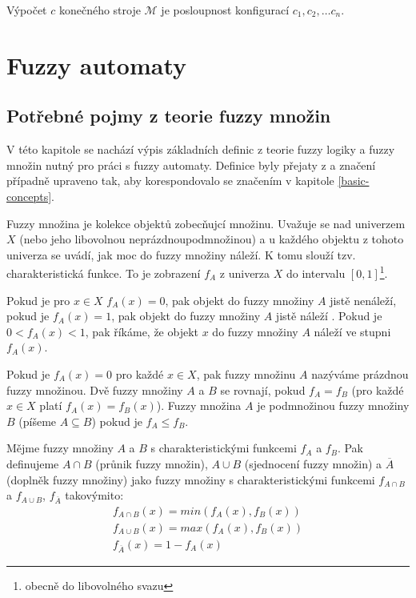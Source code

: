 \documentclass[a4paper,10pt]{article}
\begin{document}
\begin{definition}\label{machine-computation}
Výpočet $c$ konečného stroje $\mathcal{M}$ je posloupnost konfigurací $c_1, c_2, \dots c_n$.
\end{definition}


\section{Fuzzy automaty}
\subsection{Potřebné pojmy z teorie fuzzy množin}
V této kapitole se nachází výpis základních definic z teorie fuzzy logiky a fuzzy množin nutný pro práci s fuzzy automaty. Definice byly přejaty z \cite{zadeh-fuzzy-sets} a značení případně upraveno tak, aby korespondovalo se značením v kapitole \ref{basic-concepts}.

Fuzzy množina je kolekce objektů zobecňujcí  množinu. Uvažuje se nad univerzem $X$ (nebo jeho libovolnou neprázdnou\RLY podmnožinou) a u každého objektu z tohoto univerza se uvádí, jak moc do fuzzy množiny náleží. K tomu slouží tzv. charakteristická funkce. To je zobrazení $f_A$ z univerza $X$ do intervalu $\left[0, 1\right]$\footnote{obecně do libovolného svazu\RLY}. 

Pokud je pro $x \in X$ $f_A(x) = 0$, pak objekt do fuzzy množiny $A$ jistě nenáleží, pokud je $f_A(x) = 1$, pak objekt do fuzzy množiny $A$ jistě náleží . Pokud je $0 < f_A(x) < 1$, pak říkáme, že objekt $x$ do fuzzy množiny $A$ náleží ve stupni $f_A(x)$.

Pokud je $f_A(x) = 0$ pro každé $x \in X$, pak fuzzy množinu $A$ nazýváme prázdnou fuzzy množinou. Dvě fuzzy množiny $A$ a $B$ se rovnají, pokud $f_A = f_B$ (pro každé $x \in X$ platí $f_A(x) = f_B(x)$). Fuzzy množina $A$ je podmnožinou fuzzy množiny $B$ (píšeme $A \subseteq B$) pokud je $f_A \leq f_B$.

Mějme fuzzy množiny $A$ a $B$ s charakteristickými funkcemi $f_A$ a $f_B$. Pak definujeme $A \cap B$ (průnik fuzzy množin), $A \cup B$ (sjednocení fuzzy množin) a $\overline{A}$(doplněk fuzzy množiny) jako fuzzy množiny s charakteristickými funkcemi $f_{A \cap B}$ a $f_{A \cup B}$, $f_{\overline{A}}$ takovýmito:
$$
\begin{array}{l}
  f_{A \cap B}(x) = min(f_A(x), f_B(x))	\\
  f_{A \cup B}(x) = max(f_A(x), f_B(x))	\\
  f_{\overline{A}}(x) = 1 - f_A(x)		
\end{array}
$$
\end{document}
